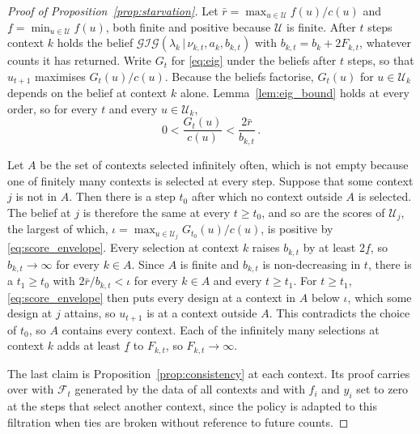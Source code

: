 \documentclass[twoside]{article}
\newcommand\given[1][]{\,#1\vert\,}
\providecommand{\Gig}{\mathcal{GIG}}  %
\theoremstyle{plain}
\theoremstyle{definition}
\theoremstyle{remark}
\begin{document}
\begin{proof}[Proof of Proposition~\ref{prop:starvation}]
    Let $\bar{r} = \max_{u \in \mathcal{U}} f(u) / c(u)$ and $\underline{f} = \min_{u \in \mathcal{U}} f(u)$, both finite and positive because $\mathcal{U}$ is finite.
    After $t$ steps context $k$ holds the belief $\Gig(\lambda_k \given \nu_{k,t}, a_k, b_{k,t})$ with $b_{k,t} = b_k + 2 F_{k,t}$, whatever counts it has returned.
    Write $G_t$ for \eqref{eq:eig} under the beliefs after $t$ steps, so that $u_{t + 1}$ maximises $G_t(u) / c(u)$.
    Because the beliefs factorise, $G_t(u)$ for $u \in \mathcal{U}_k$ depends on the belief at context $k$ alone.
    Lemma~\ref{lem:eig_bound} holds at every order, so for every $t$ and every $u \in \mathcal{U}_k$,
    \begin{equation}
        0 < \frac{G_t(u)}{c(u)} < \frac{2 \bar{r}}{b_{k,t}} \,.
        \label{eq:score_envelope}
    \end{equation}

    Let $A$ be the set of contexts selected infinitely often, which is not empty because one of finitely many contexts is selected at every step.
    Suppose that some context $j$ is not in $A$.
    Then there is a step $t_0$ after which no context outside $A$ is selected.
    The belief at $j$ is therefore the same at every $t \geq t_0$, and so are the scores of $\mathcal{U}_j$, the largest of which, $\iota = \max_{u \in \mathcal{U}_j} G_{t_0}(u) / c(u)$, is positive by \eqref{eq:score_envelope}.
    Every selection at context $k$ raises $b_{k,t}$ by at least $2 \underline{f}$, so $b_{k,t} \to \infty$ for every $k \in A$.
    Since $A$ is finite and $b_{k,t}$ is non-decreasing in $t$, there is a $t_1 \geq t_0$ with $2 \bar{r} / b_{k,t} < \iota$ for every $k \in A$ and every $t \geq t_1$.
    For $t \geq t_1$, \eqref{eq:score_envelope} then puts every design at a context in $A$ below $\iota$, which some design at $j$ attains, so $u_{t + 1}$ is at a context outside $A$.
    This contradicts the choice of $t_0$, so $A$ contains every context.
    Each of the infinitely many selections at context $k$ adds at least $\underline{f}$ to $F_{k,t}$, so $F_{k,t} \to \infty$.

    The last claim is Proposition~\ref{prop:consistency} at each context.
    Its proof carries over with $\mathcal{F}_t$ generated by the data of all contexts and with $f_i$ and $y_i$ set to zero at the steps that select another context, since the policy is adapted to this filtration when ties are broken without reference to future counts.
\end{proof}
\end{document}
